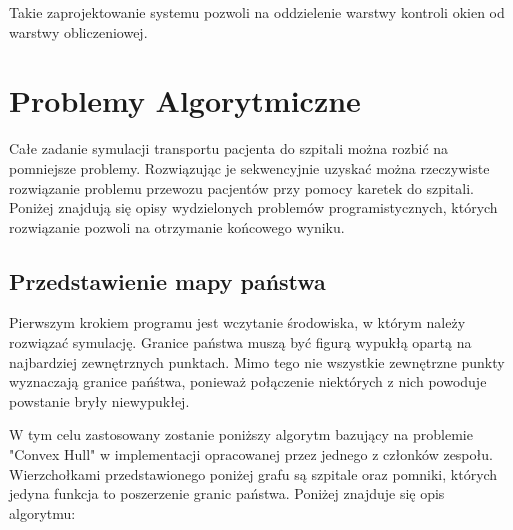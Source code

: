 \documentclass[10pt,a4paper]{article}
\begin{document}
Takie zaprojektowanie systemu pozwoli na oddzielenie warstwy kontroli okien od warstwy obliczeniowej.

\section{Problemy Algorytmiczne}

Całe zadanie symulacji transportu pacjenta do szpitali można rozbić na pomniejsze problemy.
Rozwiązując je sekwencyjnie uzyskać można rzeczywiste rozwiązanie problemu przewozu pacjentów przy pomocy karetek do szpitali.
Poniżej znajdują się opisy wydzielonych problemów programistycznych, których rozwiązanie pozwoli na otrzymanie końcowego wyniku.

\subsection{Przedstawienie mapy państwa}

Pierwszym krokiem programu jest wczytanie środowiska, w którym należy rozwiązać symulację.
Granice państwa muszą być figurą wypukłą opartą na najbardziej zewnętrznych punktach.
Mimo tego nie wszystkie zewnętrzne punkty wyznaczają granice pańśtwa, ponieważ połączenie niektórych z nich powoduje powstanie bryły niewypukłej.

W tym celu zastosowany zostanie poniższy algorytm bazujący na problemie "Convex Hull" w implementacji opracowanej przez jednego z członków zespołu.
Wierzchołkami przedstawionego poniżej grafu są szpitale oraz pomniki, których jedyna funkcja to poszerzenie granic państwa.
Poniżej znajduje się opis algorytmu:
\end{document}
